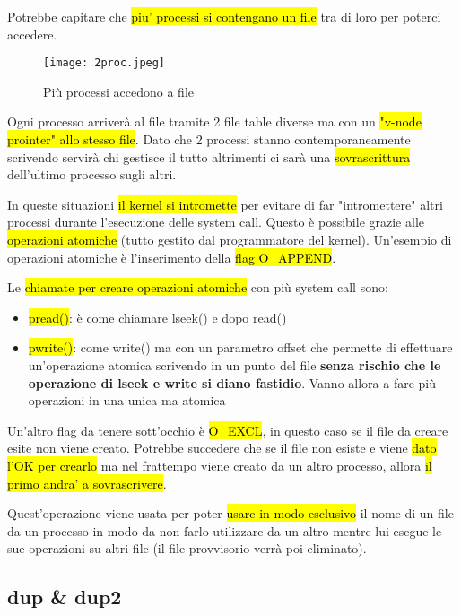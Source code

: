 Potrebbe capitare che \hl{piu' processi si contengano un file} tra di loro per poterci accedere.


\begin{figure}[H]
\centering
\texttt{[image: 2proc.jpeg]}
\caption{Più processi accedono a file} 
\label{2proc}
\end{figure}


Ogni processo arriverà al file tramite 2 file table diverse ma con un \hl{"v-node prointer" allo stesso file}. Dato che 2 processi stanno contemporaneamente scrivendo servirà chi gestisce il tutto altrimenti ci sarà una \hl{sovrascrittura} dell'ultimo processo sugli altri.

In queste situazioni \hl{il kernel si intromette} per evitare di far "intromettere" altri processi durante l'esecuzione delle system call. Questo è possibile grazie alle \hl{operazioni atomiche} (tutto gestito dal programmatore del kernel). Un'esempio di operazioni atomiche è l'inserimento della \hl{flag O\_APPEND}.

Le \hl{chiamate per creare operazioni atomiche} con più system call sono:

\begin{itemize}
	\item \hl{pread()}: è come chiamare lseek() e dopo read()
	\item \hl{pwrite()}: come write() ma con un parametro offset che permette di effettuare un'operazione atomica scrivendo in un punto del file \textbf{senza rischio che le operazione di lseek e write si diano fastidio}. Vanno allora a fare più operazioni in una unica ma atomica
\end{itemize}


Un'altro flag da tenere sott'occhio è \hl{O\_EXCL}, in questo caso se il file da creare esite non viene creato. Potrebbe succedere che se il file non esiste e viene \hl{dato l'OK per crearlo} ma nel frattempo viene creato da un altro processo, allora \hl{il primo andra' a sovrascrivere}.

Quest'operazione viene usata per poter \hl{usare in modo esclusivo} il nome di un file da un processo in modo da non farlo utilizzare da un altro mentre lui esegue le sue operazioni su altri file (il file provvisorio verrà poi eliminato).


\subsection{dup \& dup2}

